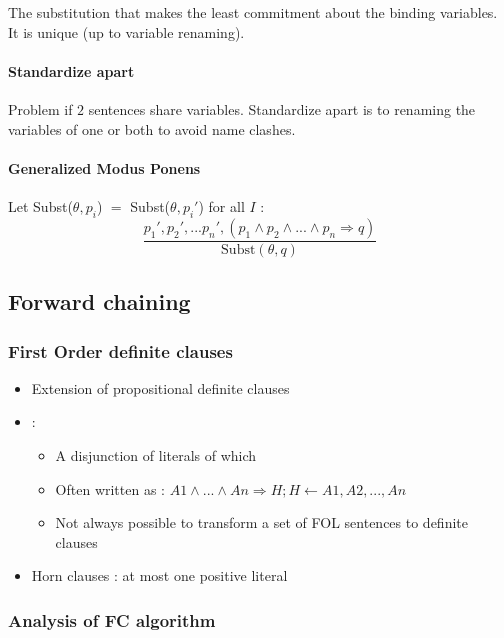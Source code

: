 The substitution that makes the least commitment about the binding variables. It is unique (up to variable renaming).

\paragraph{Standardize apart}

Problem if $2$ sentences share variables. Standardize apart is to renaming the variables of one or both to avoid name clashes.

\paragraph{Generalized Modus Ponens}

Let Subst($\theta, p_i$) $=$ Subst($\theta, p_i'$) for all $I$ :
\begin{equation*}
\frac{p_1', p_2', ... p_n', (p_1 \land p_2 \land ... \land p_n \Rightarrow q)}{\text{Subst}(\theta, q)}
\end{equation*} 

\subsection{Forward chaining}

\subsubsection{First Order definite clauses}

\begin{itemize}
\item Extension of propositional definite clauses
\item {} :
	\begin{itemize}
	\item A disjunction of literals of which 
	\item Often written as : $A1 \land ... \land An \Rightarrow H; H\leftarrow A1, A2, ..., An$
	\item Not always possible to transform a set of FOL sentences to definite clauses
	\end{itemize}
\item Horn clauses : at most one positive literal
\end{itemize}

\subsubsection{Analysis of FC algorithm}

